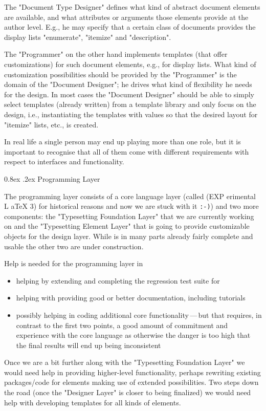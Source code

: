 \documentclass{ltnews}
\makeatletter
\def\Dash{\,---\,}
\renewcommand{\@subheadingfont}{%
   \sffamily\slshape
   \let\LaTeX\cmssLaTeX\let\TeX\cmssTeX
}
\renewcommand{\subsection}{%
   \@startsection
      {subsection}{2}{\z@}{-1.3ex \@plus -1ex \@minus -.2ex}%
      {0.8ex \@plus.2ex}{\@subheadingfont}%
}
\makeatother
\begin{document}
The "Document Type Designer" defines what kind of abstract document elements are available, and what attributes or arguments those elements provide at the author level. E.g., he may specify that a certain class of documents provides the display lists "enumerate", "itemize" and "description".

The "Programmer" on the other hand implements templates (that offer customizations) for such document elements, e.g., for display lists. What kind of customization possibilities should be provided by the "Programmer" is the domain of the "Document Designer"; he drives what kind of flexibility he needs for the design. In most cases the "Document Designer" should be able to simply select templates (already written) from a template library and only focus on the design, i.e., instantiating the templates with values so that the desired layout for "itemize" lists, etc., is created.

In real life a single person may end up playing more than one role, but it is important to recognise that all of them come with different requirements with respect to interfaces and functionality.

\subsection{Programming Layer}

The programming layer consists of a core language layer (called  (EXP erimental L aTeX 3) for historical reasons and now we are stuck with it \texttt{:-)}) and two more components: the "Typesetting Foundation Layer" that we are currently working on and the "Typesetting Element Layer" that is going to provide customizable objects for the design layer. While  is in many parts already fairly complete and usable the other two are under construction.

Help is needed for the programming layer in
\begin{itemize}
\item helping by extending and completing the regression test suite for 
\item helping with providing good or better documentation, including tutorials
\item possibly helping in coding additional core functionality\Dash but that requires, in contrast to the first two points, a good amount of commitment and experience with the core language as otherwise the danger is too high that the final results will end up being inconsistent
\end{itemize}
Once we are a bit further along with the "Typesetting Foundation Layer" we would need help in
providing higher-level functionality, perhaps rewriting existing packages/code for elements making use of extended possibilities.
Two steps down the road (once the "\mbox{Designer} Layer" is closer to being finalized) we would need help with developing templates for all kinds of elements.
\end{document}
